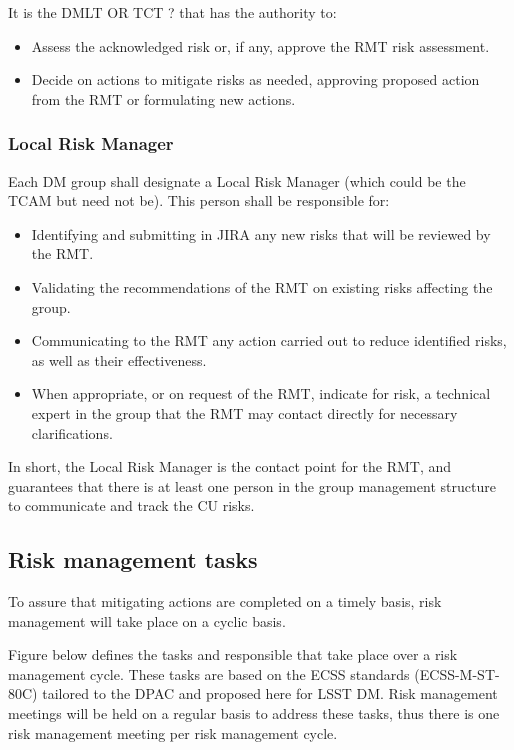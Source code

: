 It is the DMLT{\color{red} OR TCT ?} that has the authority to:
\begin{itemize}
\item Assess the acknowledged risk or, if any, approve the RMT risk assessment.
\item Decide on actions to mitigate risks as needed, approving proposed action from the RMT or formulating new actions.
\end{itemize}

\subsubsection{Local Risk Manager}
Each DM group shall designate a Local  Risk Manager (which could be the TCAM but need not be). This person shall be responsible for:

\begin{itemize}
\item Identifying and submitting in JIRA any new risks that will be reviewed by the RMT.
\item Validating the recommendations of the RMT on existing risks affecting the group.
\item Communicating to the RMT any action carried out to reduce identified risks, as well as their effectiveness.
\item When appropriate, or on request of the RMT, indicate for risk, a technical expert in the group that the RMT may contact directly for necessary clarifications.
\end{itemize}

In short, the Local Risk Manager is the contact point for the RMT, and guarantees that there is at least one person in the group management structure to communicate and track the CU risks.

\subsection{Risk management tasks \label{sect:tasks} }

To assure that mitigating actions are completed on a timely basis, risk management will take place on a cyclic basis.

Figure below defines the tasks and responsible that take place over a risk management cycle.
These tasks are based on the ECSS standards (ECSS-M-ST-80C) tailored to the DPAC and proposed here for LSST DM.
Risk management meetings will be held on a regular basis to address these tasks, thus there is one risk management meeting per risk management cycle.

